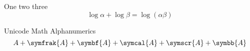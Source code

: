 \documentclass[a4paper]{article}
\begin{document}
One two three
\[
\log \alpha + \log \beta = \log(\alpha\beta)
\]

Unicode Math Alphanumerics
\[A + \symfrak{A}+\symbf{A}+ \symcal{A} + \symscr{A}+ \symbb{A}\]
\end{document}
